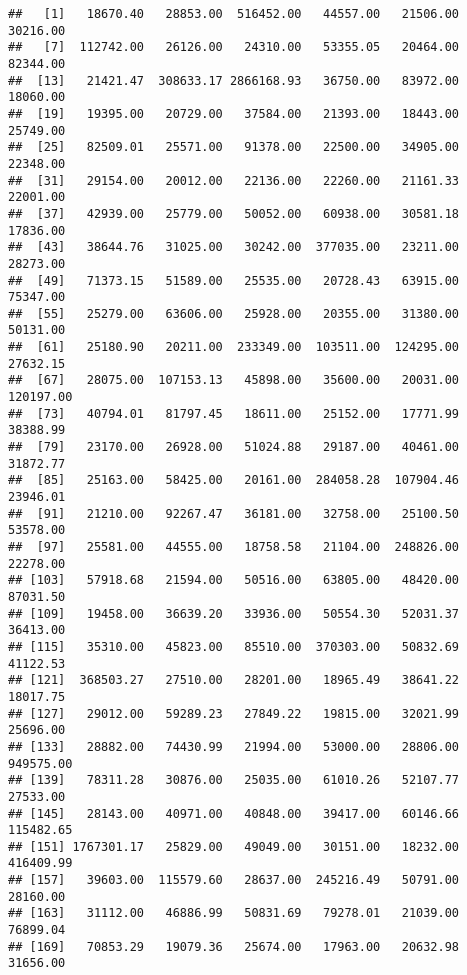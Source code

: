 \documentclass[
]{article}
\newenvironment{Shaded}{\begin{snugshade}}{\end{snugshade}}
\newcommand{\KeywordTok}[1]{\textcolor[rgb]{0.13,0.29,0.53}{\textbf{#1}}}
\newcommand{\NormalTok}[1]{#1}
\newcommand{\OperatorTok}[1]{\textcolor[rgb]{0.81,0.36,0.00}{\textbf{#1}}}
\begin{document}
\begin{Shaded}
\end{Shaded}

\begin{verbatim}
##   [1]   18670.40   28853.00  516452.00   44557.00   21506.00   30216.00
##   [7]  112742.00   26126.00   24310.00   53355.05   20464.00   82344.00
##  [13]   21421.47  308633.17 2866168.93   36750.00   83972.00   18060.00
##  [19]   19395.00   20729.00   37584.00   21393.00   18443.00   25749.00
##  [25]   82509.01   25571.00   91378.00   22500.00   34905.00   22348.00
##  [31]   29154.00   20012.00   22136.00   22260.00   21161.33   22001.00
##  [37]   42939.00   25779.00   50052.00   60938.00   30581.18   17836.00
##  [43]   38644.76   31025.00   30242.00  377035.00   23211.00   28273.00
##  [49]   71373.15   51589.00   25535.00   20728.43   63915.00   75347.00
##  [55]   25279.00   63606.00   25928.00   20355.00   31380.00   50131.00
##  [61]   25180.90   20211.00  233349.00  103511.00  124295.00   27632.15
##  [67]   28075.00  107153.13   45898.00   35600.00   20031.00  120197.00
##  [73]   40794.01   81797.45   18611.00   25152.00   17771.99   38388.99
##  [79]   23170.00   26928.00   51024.88   29187.00   40461.00   31872.77
##  [85]   25163.00   58425.00   20161.00  284058.28  107904.46   23946.01
##  [91]   21210.00   92267.47   36181.00   32758.00   25100.50   53578.00
##  [97]   25581.00   44555.00   18758.58   21104.00  248826.00   22278.00
## [103]   57918.68   21594.00   50516.00   63805.00   48420.00   87031.50
## [109]   19458.00   36639.20   33936.00   50554.30   52031.37   36413.00
## [115]   35310.00   45823.00   85510.00  370303.00   50832.69   41122.53
## [121]  368503.27   27510.00   28201.00   18965.49   38641.22   18017.75
## [127]   29012.00   59289.23   27849.22   19815.00   32021.99   25696.00
## [133]   28882.00   74430.99   21994.00   53000.00   28806.00  949575.00
## [139]   78311.28   30876.00   25035.00   61010.26   52107.77   27533.00
## [145]   28143.00   40971.00   40848.00   39417.00   60146.66  115482.65
## [151] 1767301.17   25829.00   49049.00   30151.00   18232.00  416409.99
## [157]   39603.00  115579.60   28637.00  245216.49   50791.00   28160.00
## [163]   31112.00   46886.99   50831.69   79278.01   21039.00   76899.04
## [169]   70853.29   19079.36   25674.00   17963.00   20632.98   31656.00

\end{verbatim}
\end{document}
